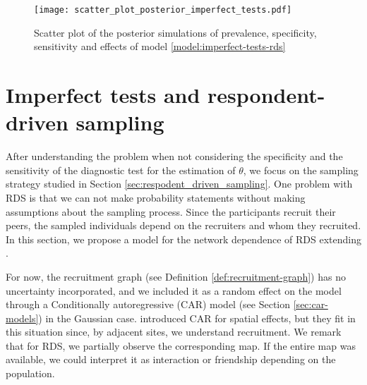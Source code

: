 \begin{figure}[ht]
  \centering
  \caption{\label{fig:scatter_plot_posterior_imperfect_tests} Scatter plot of
  the posterior simulations of prevalence, specificity, sensitivity and effects of model
  \eqref{model:imperfect-tests-rds}}
  \texttt{[image: scatter\_plot\_posterior\_imperfect\_tests.pdf]}
\end{figure}


\section{Imperfect tests and respondent-driven sampling}

After understanding the problem when not considering the specificity and the
sensitivity of the diagnostic test for the estimation of $\theta$, we focus on
the sampling strategy studied in Section \ref{sec:respodent_driven_sampling}. 
One problem with RDS is that we
can not make probability statements without making assumptions about the
sampling process. Since the participants recruit their peers, the sampled
individuals depend on the recruiters and whom they recruited. In this section,
we propose a model for the network dependence of RDS extending
\textcite{bastos2012binary}. 

For now, the recruitment graph (see Definition  \ref{def:recruitment-graph}) 
has no uncertainty
incorporated, and we included it as a random effect on the model through a
Conditionally autoregressive (CAR) model (see Section \ref{sec:car-models}) in the Gaussian case.
\textcite{besag1974spatial} introduced
CAR for spatial effects, but they fit in this situation since, by
adjacent sites, we understand recruitment. We remark that for RDS, we
partially observe the corresponding map. If the entire map was available, we
could interpret it as interaction or friendship depending on the population. 

